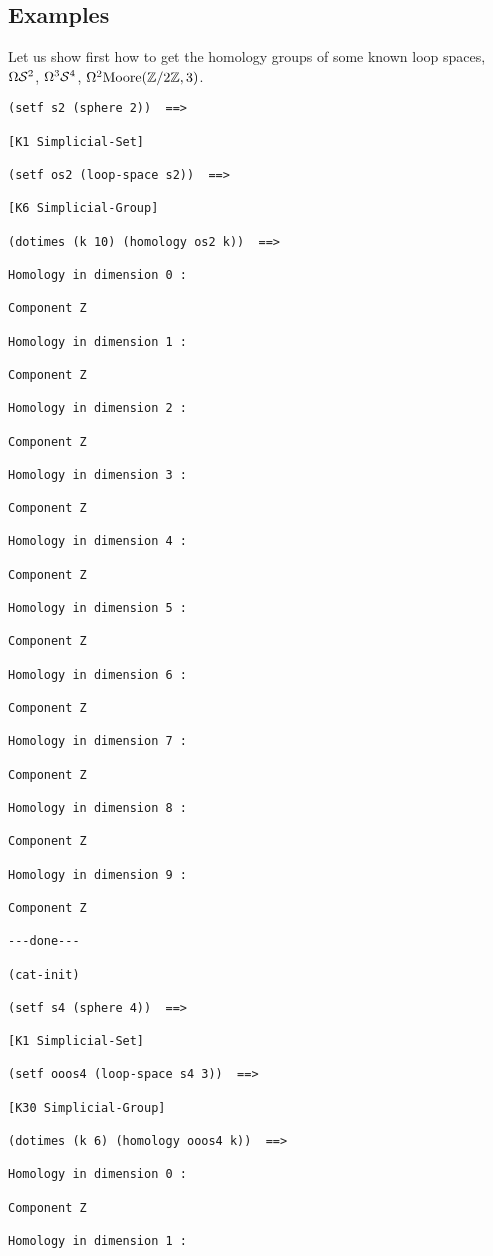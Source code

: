 \subsection* {Examples}

Let us show first how to get the homology groups of some known loop spaces,
$\Omega {\cal S}^2$, $\Omega^3 {\cal S}^4$, $\Omega^2{\rm Moore}(\mathbb{Z}/{2\mathbb{Z}},3)$.
{\footnotesize\begin{verbatim}
(setf s2 (sphere 2))  ==>

[K1 Simplicial-Set]

(setf os2 (loop-space s2))  ==>

[K6 Simplicial-Group]

(dotimes (k 10) (homology os2 k))  ==>

Homology in dimension 0 :

Component Z

Homology in dimension 1 :

Component Z

Homology in dimension 2 :

Component Z

Homology in dimension 3 :

Component Z

Homology in dimension 4 :

Component Z

Homology in dimension 5 :

Component Z

Homology in dimension 6 :

Component Z

Homology in dimension 7 :

Component Z

Homology in dimension 8 :

Component Z

Homology in dimension 9 :

Component Z

---done---

(cat-init)

(setf s4 (sphere 4))  ==>

[K1 Simplicial-Set]

(setf ooos4 (loop-space s4 3))  ==>

[K30 Simplicial-Group]

(dotimes (k 6) (homology ooos4 k))  ==>

Homology in dimension 0 :

Component Z

Homology in dimension 1 :


\end{verbatim}}
